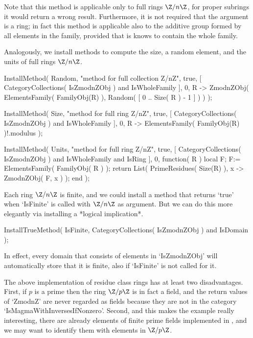 Note that this method is applicable only to full rings $\Z/n\Z$,
for proper subrings it would return a wrong result.
Furthermore, it is not required that the argument is a ring;
in fact this method is applicable also to the additive group
formed by all elements in the family,
provided that is knows to contain the whole family.

Analogously, we install methods to compute the size,
a random element, and the units of full rings $\Z/n\Z$.

\begintt
    InstallMethod( Random,
        "method for full collection Z/nZ",
        true,
        [ CategoryCollections( IsZmodnZObj ) and IsWholeFamily ], 0,
        R -> ZmodnZObj( ElementsFamily( FamilyObj(R) ),
                        Random( [ 0 .. Size( R ) - 1 ] ) ) );

    InstallMethod( Size,
        "method for full ring Z/nZ",
        true,
        [ CategoryCollections( IsZmodnZObj ) and IsWholeFamily ], 0,
        R -> ElementsFamily( FamilyObj(R) )!.modulus );

    InstallMethod( Units,
        "method for full ring Z/nZ",
        true,
        [     CategoryCollections( IsZmodnZObj )
          and IsWholeFamily and IsRing ], 0,
        function( R )
        local F;
        F:= ElementsFamily( FamilyObj( R ) );
        return List( PrimeResidues( Size(R) ), x -> ZmodnZObj( F, x ) );
        end );
\endtt

Each ring $\Z/n\Z$ is finite,
and we could install a method that returns `true' when `IsFinite' is
called with $\Z/n\Z$ as argument.
But we can do this more elegantly via installing a *logical implication*.

\begintt
    InstallTrueMethod( IsFinite,
        CategoryCollections( IsZmodnZObj ) and IsDomain );
\endtt

In effect, every domain that consists of elements in `IsZmodnZObj'
will automatically store that it is finite,
also if `IsFinite' is not called for it.



The above implementation of residue class rings has at least two
disadvantages.
First, if $p$ is a prime then the ring $\Z/p\Z$ is in fact a field,
and the return values of `ZmodnZ' are never regarded as fields because
they are not in the category `IsMagmaWithInversesIfNonzero'.
Second, and this makes the example really interesting,
there are already elements of finite prime fields implemented in {\GAP},
and we may want to identify them with elements in $\Z/p\Z$.

